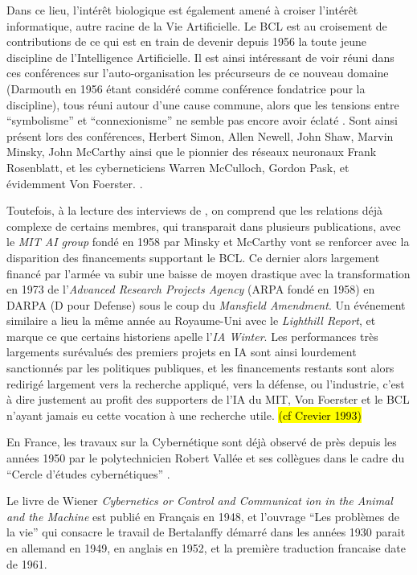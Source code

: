 Dans ce lieu, l'intérêt biologique est également amené à croiser l'intérêt informatique, autre racine de la Vie Artificielle. Le BCL est au croisement de contributions de ce qui est en train de devenir depuis 1956 la toute jeune discipline de l'Intelligence Artificielle. Il est ainsi intéressant de voir réuni dans ces conférences sur l'auto-organisation les précurseurs de ce nouveau domaine (Darmouth en 1956 étant considéré comme conférence fondatrice pour la discipline), tous réuni autour d'une cause commune, alors que les tensions entre \enquote{symbolisme} et \enquote {connexionisme} ne semble pas encore avoir éclaté . Sont ainsi présent lors des conférences, Herbert Simon, Allen Newell, John Shaw, Marvin Minsky, John McCarthy ainsi que le pionnier des réseaux neuronaux Frank Rosenblatt, et les cyberneticiens Warren McCulloch, Gordon Pask, et évidemment Von Foerster. \autocites[256]{Asaro2007}{Yovits1960}.

Toutefois, à la lecture des interviews de \textcite{Varela1995}, on comprend que les relations déjà complexe de certains membres, qui transparait dans plusieurs publications, avec le \textit{MIT AI group} fondé en 1958 par Minsky et McCarthy vont se renforcer avec la disparition des financements supportant le BCL. Ce dernier alors largement financé par l'armée va subir une baisse de moyen drastique avec la transformation en 1973 de l'\textit{Advanced Research Projects Agency} (ARPA fondé en 1958) en DARPA (D pour Defense) sous le coup du \textit{Mansfield Amendment}. Un événement similaire a lieu la même année au Royaume-Uni avec le \textit{Lighthill Report}, et marque ce que certains historiens apelle l'\textit{IA Winter}. Les performances très largements surévalués des premiers projets en IA sont ainsi lourdement sanctionnés par les politiques publiques, et les financements restants sont alors redirigé largement vers la recherche appliqué, vers la défense, ou l'industrie, c'est à dire justement au profit des supporters de l'IA du MIT, Von Foerster et le BCL n'ayant jamais eu cette vocation à une recherche utile. \hl{(cf Crevier 1993)}

En France, les travaux sur la Cybernétique sont déjà observé de près depuis les années 1950 par le polytechnicien Robert Vallée et ses collègues dans le cadre du \enquote{Cercle d’études cybernétiques} \autocite{Bricage1990}. 

Le livre de Wiener \textit{Cybernetics or Control and Communicat
ion in the Animal and the Machine} est publié en Français en 1948, et l'ouvrage \enquote{Les problèmes de la vie}  qui consacre le travail de Bertalanffy démarré dans les années 1930 parait en allemand en 1949, en anglais en 1952, et la première traduction francaise date de 1961. \autocite{Vallee2005}

